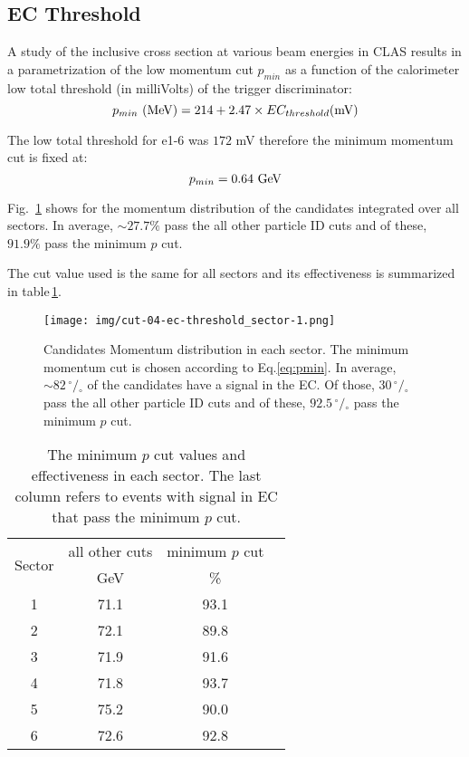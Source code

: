 \clearpage\newpage
\subsection{EC Threshold}
A study \cite{bib:ecmin} of the inclusive cross section at various beam energies in CLAS 
results in a parametrization of the low momentum cut $p_{min}$ as a function of
the calorimeter low total threshold (in milliVolts) of the trigger discriminator:
\begin{equation}
 \label{eq:pmin} 
 p_{min}\,\,{\rm (MeV)} = 214 + 2.47\times EC_{threshold}{\rm (mV)}
\end{equation}

The low total threshold for e1-6 was $172$ mV therefore the minimum momentum cut is fixed at:
$$
p_{min} = 0.64\,\,{\rm GeV}
$$

Fig.~\ref{fig:pmincut_alls} shows for the momentum distribution of the candidates integrated
over all sectors. In average, $\sim 27.7\%$  pass the all other particle ID
cuts and of these, $91.9\%$ pass the minimum $p$ cut.

The cut value used is the same for all sectors and its effectiveness is summarized in 
table\,\ref{tab:pmincut}.


\begin{figure}[ht]
  \centering
		\texttt{[image: img/cut-04-ec-threshold\_sector-1.png]}
		\caption{Candidates Momentum distribution in each sector. The minimum momentum cut is
               chosen according to Eq.\ref{eq:pmin}. In average, $\sim 82 \,^{\circ\!\!}/\!_\circ$ 
					of the candidates have a signal in the EC. Of those, $30 \,^{\circ\!\!}/\!_\circ$
					pass the all other particle ID cuts and of these, $92.5 \,^{\circ\!\!}/\!_\circ$
					pass the minimum $p$ cut.}
 		\label{fig:pmincut_alls}
\end{figure}


\begin{table}[h]
\label{tab:pmincut}
	\begin{center}
		\begin{tabular}{c | c | c | c}
			\hline 
			\multirow{2}{*}{Sector} 
					& all other cuts & minimum $p$ cut \\
					&  GeV & \% &  \\
			\hline 
			1   & 71.1 & 93.1 \\
			2   & 72.1 & 89.8 \\
			3   & 71.9 & 91.6 \\
			4   & 71.8 & 93.7 \\
			5   & 75.2 & 90.0 \\
			6   & 72.6 & 92.8 \\
			\hline
		\end{tabular}
		\caption{The minimum $p$ cut values and effectiveness in each sector.
					The last column refers to events with signal in EC that pass the 
 					minimum $p$ cut.}	
	
	\end{center}
\end{table}



